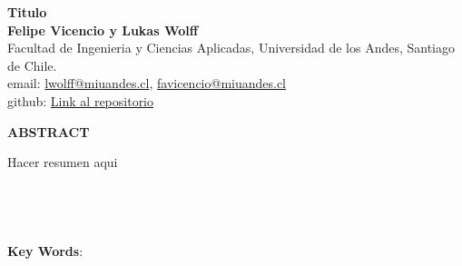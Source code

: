 \documentclass[12pt]{article} %
\begin{document}
\begin{titlepage}%
\newcommand{\HRule}{\rule{\linewidth}{0.5mm}} 
\center 
\begin{center}
  \textbf{\LARGE Titulo} \\[0.5cm]
  \textbf{Felipe Vicencio y Lukas Wolff} \\
  Facultad de Ingenieria y Ciencias Aplicadas, Universidad de los Andes, Santiago de Chile.\\
  email: \href{mailto:lwolff@miuandes.cl}{lwolff@miuandes.cl}, \href{mailto:favicencio@miuandes.cl}{favicencio@miuandes.cl}
  \\
  github: \href{https://github.com/LukasWolff2002/TAREA_3_AUTITOS}{Link al repositorio}
\end{center}

\vspace{1cm}

\begin{center}
  \textbf{\large ABSTRACT}    
\end{center}

\begin{justify}
  Hacer resumen aqui
  \\ \\ \\ \\ \\
  \textbf{Key Words}: 
\end{justify}


\vspace{1cm}

\end{titlepage}

\end{document}
